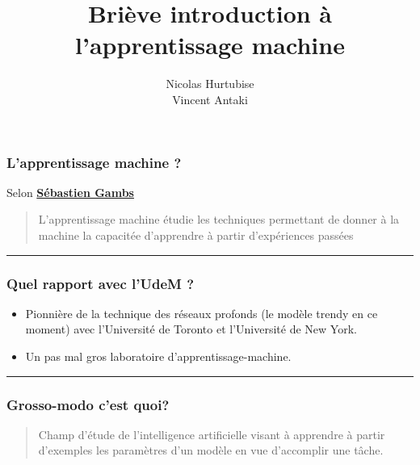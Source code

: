 \documentclass[french]{beamer}
\title[Intro-ML]{Briève introduction à l'apprentissage machine} %
\author{Nicolas Hurtubise \\
Vincent Antaki} %
\institute[UdeM] %
{
*Ou introduction aux modèles d'apprentissages non-paramétrés \\ %
\medskip
\textit{hurtubin@iro.umontreal.ca
\\antakivi@iro.umontreal.ca} %
}
\date{} %
\begin{document}
\begin{frame}
\titlepage %
\end{frame}



\begin{frame}
\frametitle{L'apprentissage machine ?}

Selon \textbf{\href{http://www.iro.umontreal.ca/~aimeur/cours/ift6261/Survol_apprentissage_machine.pdf}{Sébastien
Gambs}}

\begin{quote}
L'apprentissage machine étudie les techniques permettant de donner à la machine la capacitée d'apprendre à partir d'expériences passées
\end{quote}
\begin{center}\rule{3in}{0.4pt}\end{center}
\end{frame}

\begin{frame}
\frametitle{Quel rapport avec l'UdeM ?}

\pause
\begin{itemize}
\item Pionnière de la technique des réseaux profonds (le modèle trendy en ce moment) avec l'Université de Toronto et l'Université de New York.

\pause
\item Un pas mal gros laboratoire d'apprentissage-machine.
\end{itemize}

\begin{center}\rule{3in}{0.4pt}\end{center}

\end{frame}


\begin{frame}
\frametitle{Grosso-modo c'est quoi?}

\begin{quote}
Champ d'étude de l'intelligence artificielle visant à apprendre à partir d'exemples les paramètres d'un modèle en vue d'accomplir une tâche.
\end{quote}
\end{frame}
\end{document}
